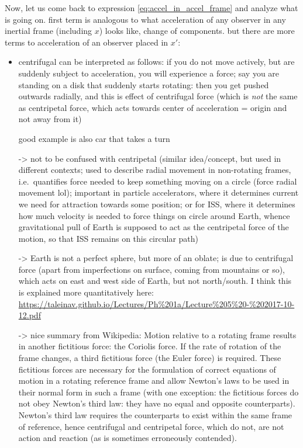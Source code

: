 \documentclass[../class_mech_main.tex]{subfiles}
\begin{document}
Now, let us come back to expression \eqref{eq:accel_in_accel_frame} and analyze what is going on. first term is analogous to what acceleration of any observer in any inertial frame (including $x$) looks like, change of components. but there are more terms to acceleration of an observer placed in $x'$:
\begin{itemize}
    \item centrifugal can be interpreted as follows: if you do not move actively, but are suddenly subject to acceleration, you will experience a force; say you are standing on a disk that suddenly starts rotating: then you get pushed outwards radially, and this is effect of centrifugal force (which is \emph{not} the same as centripetal force, which acts towards center of acceleration = origin and not away from it)
    
    good example is also car that takes a turn
    
    -> not to be confused with centripetal (similar idea/concept, but used in different contexts; used to describe radial movement in non-rotating frames, i.e.~quantifies force needed to keep something moving on a circle (force radial movement lol); important in particle accelerators, where it determines current we need for attraction towards some position; or for ISS, where it determines how much velocity is needed to force things on circle around Earth, whence gravitational pull of Earth is supposed to act as the centripetal force of the motion, so that ISS remains on this circular path)

    -> Earth is not a perfect sphere, but more of an oblate; is due to centrifugal force (apart from imperfections on surface, coming from mountains or so), which acts on east and west side of Earth, but not north/south. I think this is explained more quantitatively here: \url{https://taleinav.github.io/Lectures/Ph%201a/Lecture%205%20-%202017-10-12.pdf}


    -> nice summary from Wikipedia: Motion relative to a rotating frame results in another fictitious force: the Coriolis force. If the rate of rotation of the frame changes, a third fictitious force (the Euler force) is required. These fictitious forces are necessary for the formulation of correct equations of motion in a rotating reference frame and allow Newton's laws to be used in their normal form in such a frame (with one exception: the fictitious forces do not obey Newton's third law: they have no equal and opposite counterparts). Newton's third law requires the counterparts to exist within the same frame of reference, hence centrifugal and centripetal force, which do not, are not action and reaction (as is sometimes erroneously contended).



\end{itemize}
\end{document}
